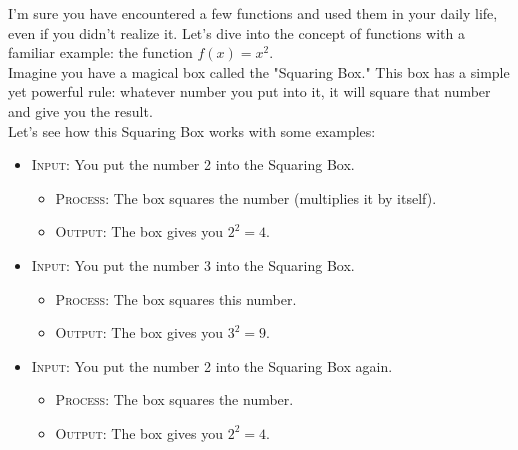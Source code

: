 

I'm sure you have encountered a few functions and used them in your daily life, even if you didn't realize it. Let's dive into the concept of functions with a familiar example: the function \( f(x) = x^2 \).\\


Imagine you have a magical box called the "Squaring Box." This box has a simple yet powerful rule: whatever number you put into it, it will square that number and give you the result.\\[2mm]


Let's see how this Squaring Box works with some examples:

\begin{itemize}
    \item \textsc{Input}: You put the number 2 into the Squaring Box.
    \begin{itemize}
        \item \textsc{Process}: The box squares the number (multiplies it by itself).
        \item \textsc{Output}: The box gives you \( 2^2 = 4 \).
    \end{itemize}
    
    \item \textsc{Input}: You put the number 3 into the Squaring Box.
    \begin{itemize}
        \item \textsc{Process}: The box squares this number.
        \item \textsc{Output}: The box gives you \( 3^2 = 9 \).
    \end{itemize}
    
    \item \textsc{Input}: You put the number 2 into the Squaring Box again.
    \begin{itemize}
        \item \textsc{Process}: The box squares the number.
        \item \textsc{Output}: The box gives you \( 2^2 = 4 \).
    \end{itemize}
\end{itemize}

